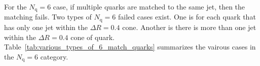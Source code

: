 \documentclass[12pt]{article}
\begin{document}
	For the $N_{\text{q}} = 6$ case, if multiple quarks are matched to the same jet, then the matching fails. Two types of $N_{\text{q}} = 6$ failed cases exist. One is for each quark that has only one jet within the $\Delta R=0.4$ cone. Another is there is more than one jet within the $\Delta R = 0.4$ cone of quark. Table~\ref{tab:various_types_of_6_match_quarks} summarizes the vairous cases in the $N_{\text{q}} = 6$ category.
	\begin{table}[htpb]
		\centering
        \caption{The quark matching table. $N_{\text{q}}$ is the number of quarks that can be matched to jets in an event.}
		\label{tab:number_of_quark_match_to_jet}
	\end{table}
\end{document}
